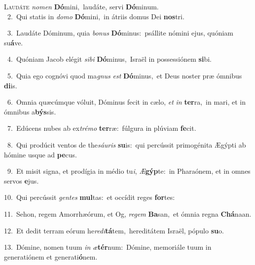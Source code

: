 \lettrine{\initial\textcolor{\initialcolor}{L}}{audáte} \textit{no}\-\textit{men} \textbf{Dó}\-mini,~\star laudáte, servi \textbf{Dó}\-minum.\\
{\numbfont\textcolor{\numbcolor}{~2.}}~Qui statis in \textit{do}\-\textit{mo} \textbf{Dó}\-mini,~\star in átriis domus Dei \textbf{nos}\-tri.\par
{\numbfont\textcolor{\numbcolor}{~3.}}~Laudáte Dóminum, quia \textit{bo}\-\textit{nus} \textbf{Dó}\-minus:~\star psállite nómini ejus, quóniam su\-\textbf{á}\-ve.\par
{\numbfont\textcolor{\numbcolor}{~4.}}~Quóniam Jacob elégit \textit{si}\-\textit{bi} \textbf{Dó}\-minus,~\star Israël in possessiónem \textbf{si}\-bi.\par
{\numbfont\textcolor{\numbcolor}{~5.}}~Quia ego cognóvi quod ma\textit{gnus} \textit{est} \textbf{Dó}\-minus,~\star et Deus noster præ ómnibus \textbf{di}\-is.\par
{\numbfont\textcolor{\numbcolor}{~6.}}~Omnia quæcúmque vóluit, Dóminus fecit in cælo, \textit{et} \textit{in} \textbf{ter}\-ra,~\star in mari, et in ómnibus a\-\textbf{býs}\-sis.\par
{\numbfont\textcolor{\numbcolor}{~7.}}~Edúcens nubes ab ex\-\textit{tré}\-\textit{mo} \textbf{ter}\-ræ:~\star fúlgura in plúviam \textbf{fe}\-cit.\par
{\numbfont\textcolor{\numbcolor}{~8.}}~Qui prodúcit ventos de the\-\textit{sáu}\-\textit{ris} \textbf{su}\-is:~\star qui percússit primogénita Ægýpti ab hómine usque ad \textbf{pe}\-cus.\par
{\numbfont\textcolor{\numbcolor}{~9.}}~Et misit signa, et prodígia in médio tu\-\textit{i}\-, \textit{Æ}\-\textbf{gýp}te:~\star in Pharaónem, et in omnes servos \textbf{e}\-jus.\par
{\numbfont\textcolor{\numbcolor}{10.}}~Qui percússit \textit{gen}\-\textit{tes} \textbf{mul}\-tas:~\star et occídit reges \textbf{for}\-tes:\par
{\numbfont\textcolor{\numbcolor}{11.}}~Sehon, regem Amorrhæórum, et Og, \textit{re}\-\textit{gem} \textbf{Ba}\-san,~\star et ómnia regna \textbf{Chá}\-naan.\par
{\numbfont\textcolor{\numbcolor}{12.}}~Et dedit terram eórum he\-\textit{re}\-\textit{di}\textbf{tá}tem,~\star hereditátem Israël, pópulo \textbf{su}\-o.\par
{\numbfont\textcolor{\numbcolor}{13.}}~Dómine, nomen tuum \textit{in} \textit{æ}\-\textbf{tér}num:~\star Dómine, memoriále tuum in generatiónem et generati\-\textbf{ó}\-nem.\par

